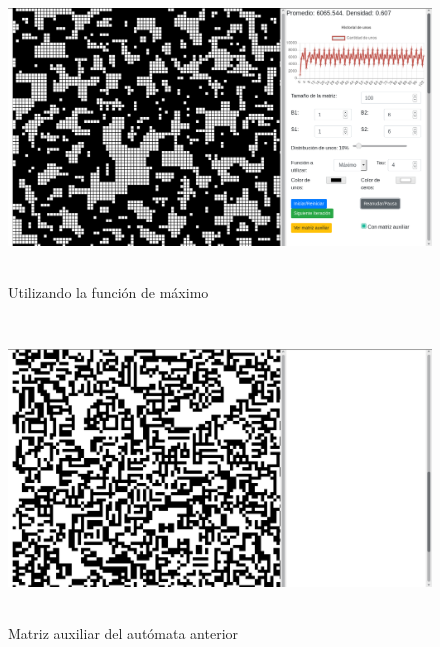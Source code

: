 \documentclass[12pt, titlepage]{article}
\begin{document}
\begin{figure}[H]
\begin{center}
 \includegraphics[width=15cm, height=8cm]{./img/1616-max.png}
 \caption{Utilizando la función de máximo}
 \label{fig:1616-max}
\end{center}
\end{figure}

\begin{figure}[H]
\begin{center}
 \includegraphics[width=15cm, height=8cm]{./img/1616-max-aux.png}
 \caption{Matriz auxiliar del autómata anterior}
 \label{fig:1616-max-aux}
\end{center}
\end{figure}
\end{document}
